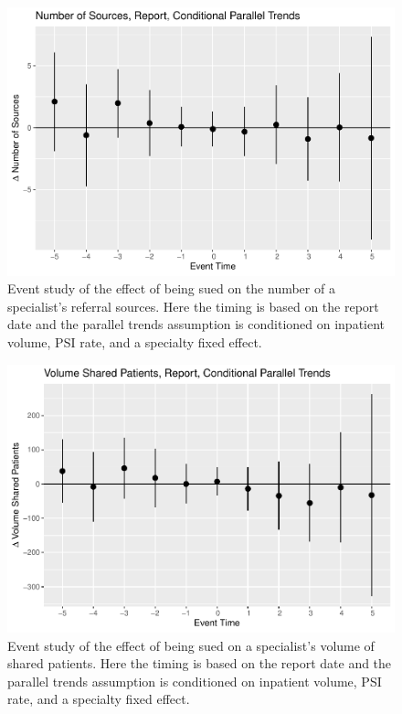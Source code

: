 \documentclass[
  12pt,
]{article}
\begin{document}
\begin{figure}
\centering
\includegraphics{Paper_files/figure-latex/nsrcrepestud-1.pdf}
\caption{\label{fig:nsrcrepestud}Event study of the effect of being sued on the number of a specialist's referral sources. Here the timing is based on the report date and the parallel trends assumption is conditioned on inpatient volume, PSI rate, and a specialty fixed effect.}
\end{figure}

\begin{figure}
\centering
\includegraphics{Paper_files/figure-latex/volrepestud-1.pdf}
\caption{\label{fig:volrepestud}Event study of the effect of being sued on a specialist's volume of shared patients. Here the timing is based on the report date and the parallel trends assumption is conditioned on inpatient volume, PSI rate, and a specialty fixed effect.}
\end{figure}
\end{document}
